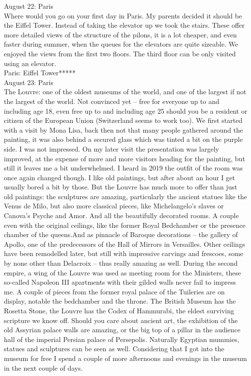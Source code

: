 August 22: Paris\\
Where would you go on your first day in Paris. My parents decided it should be the Eiffel Tower. Instead of taking the elevator up we took the stairs. These offer more detailed views of the structure of the pilons, it is a lot cheaper, and even faster during summer, when the queues for the elevators are quite sizeable. We enjoyed the views from the first two floors. The third floor can be only visited using an elevator.\\

Paris: Eiffel Tower*****\\

August 23: Paris\\
The Louvre: one of the oldest museums of the world, and one of the largest if not the largest of the world. Not convinced yet -- free for everyone up to and including age 18, even free up to and including age 25 should you be a resident or citizen of the European Union (Switzerland seems to work too). We first started with a visit by Mona Lisa, back then not that many people gathered around the painting, it was also behind a secured glass which was tinted a bit on the purple side. I was not impressed. On my later visit the presentation was largely improved, at the expense of more and more visitors heading for the painting, but still it leaves me a bit underwhelmed. I heard in 2019 the outfit of the room was once again changed though. I like old paintings, but after about an hour I get usually bored a bit by those. But the Louvre has much more to offer than just old paintings: the sculptures are amazing, particularly the ancient statues like the Venus de Milo, but also more classical pieces, like Michelangelo's slaves or Canova's Psyche and Amor. And all the beautifully decorated rooms. A couple even with the original ceilings, like the former Royal Bedchamber or the presence chamber of the queens.And as pinnacle of Baroque decorations -- the gallery of Apollo, one of the predecessors of the Hall of Mirrors in Versailles. Other ceilings have been remodelled later, but still with impressive carvings and frescoes, some by none other than Delacroix -- thus really amazing as well. During the second empire, a wing of the Louvre was used as meeting room for the Ministers, these so-called Napoleon III apartments with their gilded walls never fail to impress me. A couple of pieces from the former royal palace of the Tuileries are on display, notable the bedchamber and the throne. The British Museum has the Rosetta Stone, the Louvre has the Codex of Hammurabi, the eldest surviving scripture we know off. Should you care about ancient art, the exhibition of the old Assyrian palace walls are amazing, or the big top of a pillar in the audience hall of the imperial Persian palace of Persepolis. Naturally Egyptian mummies, statues and sculptures can be seen as well. Considering that I got into the museum for free I spend a couple of more afternoons and evenings in the museum in the next couple of days.\\

